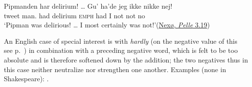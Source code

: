 \ea \label{ex:07-46}
\gll Pipmanden har delirium! {\dots} Gu' ha'de jeg ikke nikke nej!\\ %
 {tweet man.\DEF{}} had {delirium} {} \textsc{emph} had I not not no\\
\glt `Pipman was delirious! {\dots} I most certainly was not!'\hfill(\href{https://archive.org/details/pelleerobrerenro03ande/page/18/mode/2up?q=%22delirium%22&view=theater}{Nexø, \textit{Pelle} 3.19}) %
\z{}


An English case of special interest is with \textit{hardly} (on the negative value of this see p.~\pageref{sec:incomplete-negation}) in combination with a preceding negative word, which is felt to be too absolute and is therefore softened down by the addition; the two negatives thus in this case neither neutralize nor strengthen one another. Examples (none in Shakespeare): .\largerpage

